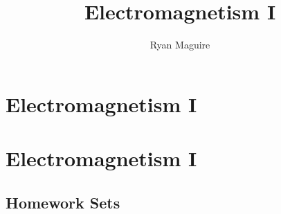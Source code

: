 \documentclass[crop=false,class=book,oneside]{standalone}
\begin{document}
    \ifx\ifphysicscourses\undefined
        \title{Electromagnetism I}
        \author{Ryan Maguire}
        \date{\vspace{-5ex}}
        \maketitle
        \tableofcontents
        \listoffigures
        \clearpage
        \chapter*{Electromagnetism I}
        \setcounter{chapter}{1}
    \else
        \chapter{Electromagnetism I}
    \fi
    \section{Homework Sets}
\end{document}
